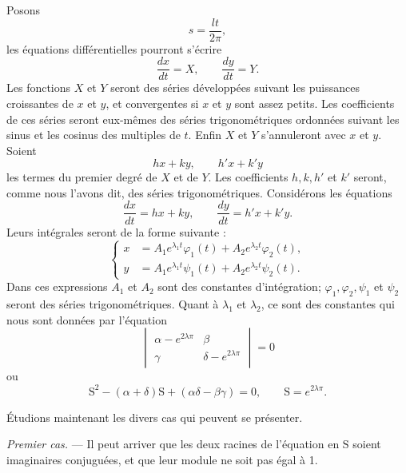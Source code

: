 \documentclass[11pt]{article}
\begin{document}
Posons
\[
s=\frac{lt}{2\pi},
\]
les équations différentielles pourront s’écrire
\[
\frac{dx}{dt}=X,
\qquad
\frac{dy}{dt}=Y.
\]
Les fonctions $X$ et $Y$ seront des séries développées suivant les puissances croissantes de $x$ et $y$, et convergentes si $x$ et $y$ sont assez petits. Les coefficients de ces séries seront eux-mêmes des séries trigonométriques ordonnées suivant les sinus et les cosinus des multiples de $t$. Enfin $X$ et $Y$ s’annuleront avec $x$ et $y$. Soient
\[
hx+ky,
\qquad
h'x+k'y
\]
les termes du premier degré de $X$ et de $Y$. Les coefficients $h,k,h'$ et $k'$ seront, comme nous l’avons dit, des séries trigonométriques. Considérons les équations
\[
\frac{dx}{dt}=hx+ky,
\qquad
\frac{dy}{dt}=h'x+k'y.
\]
Leurs intégrales seront de la forme suivante :
\begin{equation}
\left\{
\begin{aligned}
x&=A_1e^{\lambda_1t}\varphi_1(t)+A_2e^{\lambda_2t}\varphi_2(t),\\
y&=A_1e^{\lambda_1t}\psi_1(t)+A_2e^{\lambda_2t}\psi_2(t).
\end{aligned}
\right.
\tag{1}
\end{equation}
Dans ces expressions $A_1$ et $A_2$ sont des constantes d’intégration; $\varphi_1,\varphi_2,\psi_1$ et $\psi_2$ seront des séries trigonométriques. Quant à $\lambda_1$ et $\lambda_2$, ce sont des constantes qui nous sont données par l’équation
\[
\begin{vmatrix}
\alpha-e^{2\lambda\pi}&\beta\\
\gamma&\delta-e^{2\lambda\pi}
\end{vmatrix}=0
\]
ou
\begin{equation}
\mathrm{S}^2-(\alpha+\delta)\mathrm{S}+(\alpha\delta-\beta\gamma)=0,
\qquad
\mathrm{S}=e^{2\lambda\pi}.
\tag{2}
\end{equation}

Étudions maintenant les divers cas qui peuvent se présenter.

\emph{Premier cas.} — Il peut arriver que les deux racines de l’équation en $\mathrm{S}$ soient imaginaires conjuguées, et que leur module ne soit pas égal à 1.
\end{document}
